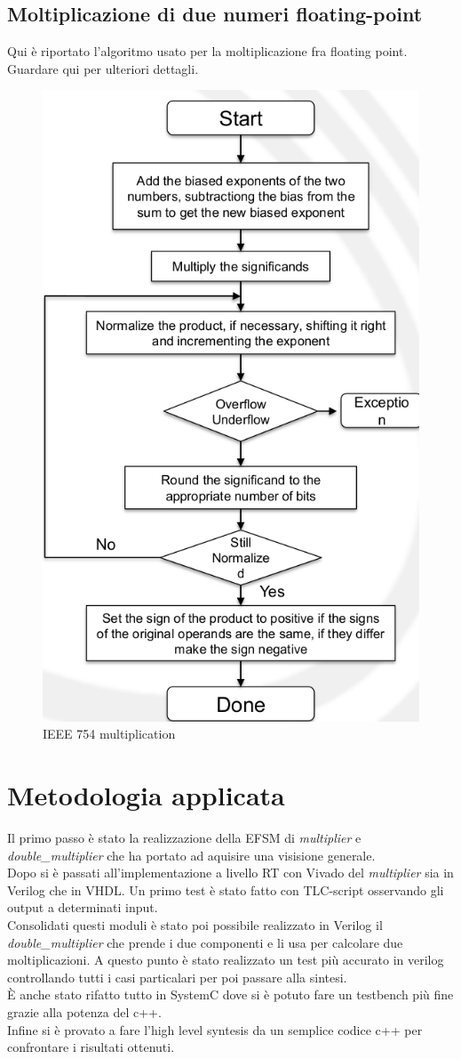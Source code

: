 \documentclass[]{IEEEtran}
\begin{document}
\subsection{Moltiplicazione di due numeri floating-point}
Qui è riportato l'algoritmo usato per la moltiplicazione fra floating point. Guardare qui per ulteriori dettagli\cite{IEE754Mult}.
\begin{figure}[!htb]
    \centering
    \includegraphics[width=0.6\linewidth]{figures/ieee_multiplication.png}
    \caption{IEEE 754 multiplication}
    \label{fig:IEEE_multiplication}
\end{figure}



\section{Metodologia applicata}
Il primo passo è stato la realizzazione della EFSM di \textit{multiplier} e \textit{double\_multiplier} che ha portato ad aquisire una visisione generale.
\\Dopo si è passati all'implementazione a livello RT con Vivado\cite{Vivado} del \textit{multiplier} sia in Verilog che in VHDL. Un primo test è stato fatto con TLC-script osservando gli output a determinati input.
\\Consolidati questi moduli è stato poi possibile realizzato in Verilog il \textit{double\_multiplier} che prende i due componenti e li usa per calcolare due moltiplicazioni. A questo punto è stato realizzato un test più accurato in verilog controllando tutti i casi particalari per poi passare alla sintesi.
\\È anche stato rifatto tutto in SystemC dove si è potuto fare un testbench più fine grazie alla potenza del c++.
\\Infine si è provato a fare l'high level syntesis da un semplice codice c++ per confrontare i risultati ottenuti.
\end{document}
